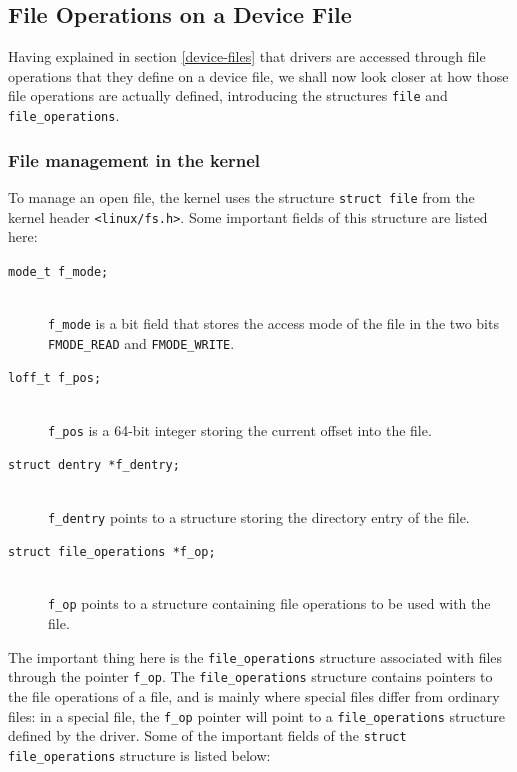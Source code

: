 \subsection{File Operations on a Device File}
Having explained in section \ref{device-files} that drivers are accessed through file operations that they define on a device file, we shall now look closer at how those file operations are actually defined, introducing the structures \texttt{file} and \texttt{file\_operations}.

\subsubsection{File management in the kernel}\label{sec:file-structure}
To manage an open file, the kernel uses the structure \texttt{struct file} from the kernel header \texttt{<linux/fs.h>}. Some important fields of this structure are listed here:
\begin{description}
  \item[\texttt{mode\_t f\_mode;}] \hfill \\
    \texttt{f\_mode} is a bit field that stores the access mode of the file in the two bits \texttt{FMODE\_READ} and \texttt{FMODE\_WRITE}.
  \item[\texttt{loff\_t f\_pos;}] \hfill \\
    \texttt{f\_pos} is a 64-bit integer storing the current offset into the file.
  \item[\texttt{struct dentry *f\_dentry;}] \hfill \\
    \texttt{f\_dentry} points to a structure storing the directory entry of the file.   
  \item[\texttt{struct file\_operations *f\_op;}] \hfill \\
    \texttt{f\_op} points to a structure containing file operations to be used with the file.
\end{description}
The important thing here is the \texttt{file\_operations} structure associated with files through the pointer \texttt{f\_op}. The \texttt{file\_operations} structure contains pointers to the file operations of a file, and is mainly where special files differ from ordinary files: in a special file, the \texttt{f\_op} pointer will point to a \texttt{file\_operations} structure defined by the driver. Some of the important fields of the \texttt{struct file\_operations} structure is listed below:

